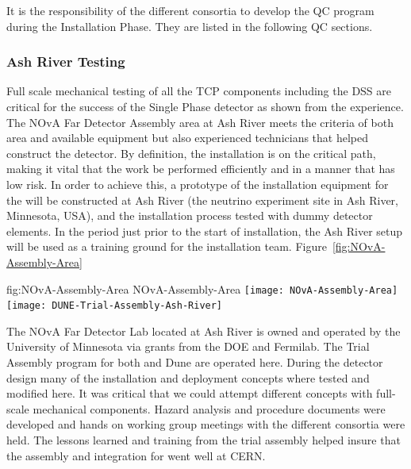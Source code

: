 It is the responsibility of the different consortia to develop the QC program during the Installation Phase. 
They are listed in the following QC sections. 

\subsubsection{Ash River Testing}

Full scale mechanical testing of all the TCP components including the DSS are critical for the success of the Single Phase detector as shown from the  experience. 
The NOvA Far Detector Assembly area at Ash River meets the criteria of both area and available equipment but also experienced technicians that helped construct the  detector. 
By definition, the installation  is on the critical path, making it vital that the work be performed efficiently and in a manner that has low risk. 
In order to achieve this, a prototype of the installation
equipment for the   will be constructed at Ash River (the \nova neutrino experiment  site in Ash River, Minnesota, USA), and the installation process tested with dummy detector
elements.  
In the period just prior to the start of
installation, the Ash River setup will be used as a training ground for the installation team.
Figure~\ref{fig:NOvA-Assembly-Area}
\begin{dunefigure}
{fig:NOvA-Assembly-Area}
{NOvA-Assembly-Area}                
\texttt{[image: NOvA-Assembly-Area]}
\texttt{[image: DUNE-Trial-Assembly-Ash-River]}
\end{dunefigure}




The NOvA Far Detector Lab located at Ash River is owned and operated by the University of Minnesota via grants from the DOE and Fermilab. The Trial Assembly program for both  and Dune are operated here. During the  detector design many of the installation and deployment concepts where tested and modified here.  It was critical that we could attempt different concepts with full-scale mechanical components. Hazard analysis and procedure documents were developed and hands on working group meetings with the different consortia were held.  The lessons learned and training from the trial assembly helped insure that the assembly and integration for  went well at CERN.

